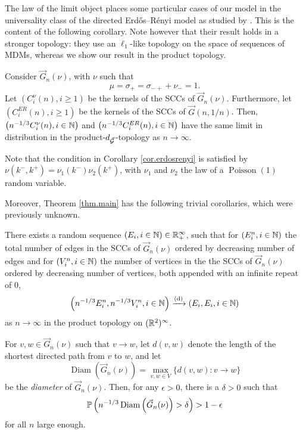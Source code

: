 The law of the limit object places some particular cases of our model in the universality class of the directed Erd\H{o}s--Rényi model as studied by \citet{goldschmidtScalingLimitCritical2019}. This is the content of the following corollary. Note however that their result holds in a stronger topology: they use an $\ell_1$-like topology on the space of sequences of MDMs, whereas we show our result in the product topology. 
\begin{corollary}\label{cor.erdosrenyi}
Consider $\vec{G}_n(\nu)$, with $\nu$ such that $$\mu=\sigma_+=\sigma_{-+}+\nu_-=1.$$ 
Let $(C^\nu_i(n), i\geq 1)$ be the kernels of the SCCs of $\vec{G}_n(\nu)$. Furthermore, let $(C^{ER}_i(n), i\geq 1)$ be the kernels of the SCCs of $\vec{G}(n,1/n)$. Then, $\left(n^{-1/3}C^\nu_i(n),i\in \N\right)$ and 
$\left(n^{-1/3}C^{ER}_i(n),i\in \N\right)$ have the same limit in distribution in the product-$d_{\vec{\cG}}$-topology as $n\to \infty$. 
\end{corollary}
Note that the condition in Corollary \ref{cor.erdosrenyi} is satisfied by $\nu(k^-,k^+)=\nu_1(k^-)\nu_2(k^+)$, with $\nu_1$ and $\nu_2$ the law of a $\operatorname{Poisson}(1)$ random variable.

Moreover, Theorem \ref{thm.main} has the following trivial corollaries, which were previously unknown. 
\begin{corollary}\label{cor.componentsizes}
There exists a random sequence $(E_i,i\in \N)\in \R_+^\infty$, such that for $(E^n_i,i\in \N)$ the total number of edges in the SCCs of $\vec{G}_n(\nu)$ ordered by decreasing number of edges and for $(V^n_i,i\in\N)$ the number of vertices in the the SCCs of $\vec{G}_n(\nu)$ ordered by decreasing number of vertices, both appended with an infinite repeat of $0$,
$$\left(n^{-1/3}E^n_i,n^{-1/3}V^n_i, i\in \N\right)\todist\left(E_i,E_i,i\in \N\right)$$
as $n\to \infty$ in the product topology on $(\R^2)^\infty$. 
\end{corollary}
\begin{corollary}\label{cor.diameter}
For $v,w\in \vec{G}_n(\nu)$ such that $v\to w$, let $d(v,w)$ denote the length of the shortest directed path from $v$ to $w$, and let $$\operatorname{Diam}\left(\vec{G}_n(\nu)\right)=\max_{v,w\in V}\{d(v,w):v\to w\}$$ be the \emph{diameter} of $\vec{G}_n(\nu)$. Then, for any $\epsilon>0$, there is a $\delta>0$ such that $$\P\left( n^{-1/3}\operatorname{Diam}\left(\vec{G}_n(\nu)\right)>\delta\right)>1-\epsilon$$ for all $n$ large enough.
\end{corollary}


